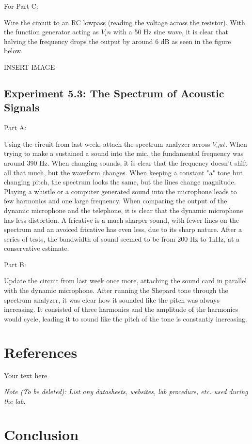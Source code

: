 \documentclass[10pt]{article}
\begin{document}
For Part C: 

Wire the circuit to an RC lowpass (reading the voltage across the resistor). With the function generator acting as $V_in$ with a 50 Hz sine wave, it is clear that halving the frequency drops the output by around 6 dB as seen in the figure below.

INSERT IMAGE 

\subsection{Experiment 5.3: The Spectrum of Acoustic Signals}

Part A:

Using the circuit from last week, attach the spectrum analyzer across $V_out$. When trying to make a sustained a sound into the mic, the fundamental frequency was around 390 Hz. When changing sounds, it is clear that the frequency doesn't shift all that much, but the waveform changes. When keeping a constant "a" tone but changing pitch, the spectrum looks the same, but the lines change magnitude. Playing a whistle or a computer generated sound into the microphone leads to few harmonics and one large frequency. When comparing the output of the dynamic microphone and the telephone, it is clear that the dynamic microphone has less distortion. A fricative is a much sharper sound, with fewer lines on the spectrum and an avoiced fricative has even less, due to its sharp nature. After a series of tests, the bandwidth of sound seemed to be from 200 Hz to 1kHz, at a conservative estimate.

Part B:

Update the circuit from last week once more, attaching the sound card in parallel with the dynamic microphone.  After running the Shepard tone through the spectrum analyzer, it was clear how it sounded like the pitch was always increasing. It consisted of three harmonics and the amplitude of the harmonics would cycle, leading it to sound like the pitch of the tone is constantly increasing. 


\section{References}

Your text here

\medskip

\textit{Note (To be deleted): List any datasheets, websites, lab procedure, etc. used during the lab.}

\section{Conclusion}
\end{document}
